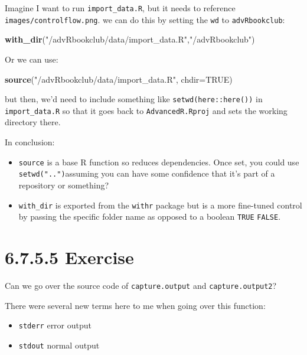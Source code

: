 \documentclass[]{book}
\newenvironment{Shaded}{\begin{snugshade}}{\end{snugshade}}
\newcommand{\DataTypeTok}[1]{\textcolor[rgb]{0.13,0.29,0.53}{#1}}
\newcommand{\KeywordTok}[1]{\textcolor[rgb]{0.13,0.29,0.53}{\textbf{#1}}}
\newcommand{\NormalTok}[1]{#1}
\newcommand{\OtherTok}[1]{\textcolor[rgb]{0.56,0.35,0.01}{#1}}
\newcommand{\StringTok}[1]{\textcolor[rgb]{0.31,0.60,0.02}{#1}}
\providecommand{\tightlist}{%
  \setlength{\itemsep}{0pt}\setlength{\parskip}{0pt}}
\begin{document}
Imagine I want to run \texttt{import\_data.R}, but it needs to reference \texttt{images/controlflow.png}. we can do this by setting the \texttt{wd} to \texttt{advRbookclub}:

\begin{Shaded}
\begin{Highlighting}[]
\KeywordTok{with_dir}\NormalTok{(}\StringTok{"/advRbookclub/data/import_data.R"}\NormalTok{,}\StringTok{"/advRbookclub"}\NormalTok{)}
\end{Highlighting}
\end{Shaded}

Or we can use:

\begin{Shaded}
\begin{Highlighting}[]
\KeywordTok{source}\NormalTok{(}\StringTok{"/advRbookclub/data/import_data.R"}\NormalTok{, }\DataTypeTok{chdir=}\OtherTok{TRUE}\NormalTok{)}
\end{Highlighting}
\end{Shaded}

but then, we'd need to include something like \texttt{setwd(here::here())} in \texttt{import\_data.R} so that it goes back to \texttt{AdvancedR.Rproj} and sets the working directory there.

In conclusion:

\begin{itemize}
\item
  \texttt{source} is a base R function so reduces dependencies. Once set, you could use \texttt{setwd("..")}assuming you can have some confidence that it's part of a repository or something?
\item
  \texttt{with\_dir} is exported from the \texttt{withr} package but is a more fine-tuned control by passing the specific folder name as opposed to a boolean \texttt{TRUE} \textbar{} \texttt{FALSE}.
\end{itemize}

\hypertarget{exercise-6}{%
\section*{6.7.5.5 Exercise}\label{exercise-6}}

Can we go over the source code of \texttt{capture.output} and \texttt{capture.output2}?

There were several new terms here to me when going over this function:

\begin{itemize}
\tightlist
\item
  \texttt{stderr} error output
\item
  \texttt{stdout} normal output
\end{itemize}
\end{document}
